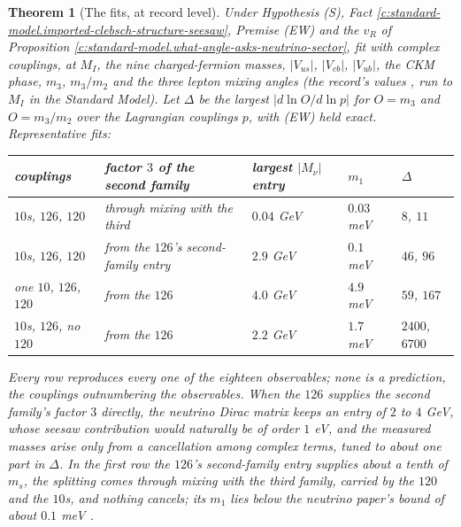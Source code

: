 \documentclass[11pt]{article}
\newtheorem{theorem}{Theorem}[section]
\theoremstyle{definition}
\theoremstyle{plain}
\newcommand{\changedmark}[2]{\marginpar{\raggedright\scriptsize\color{#1}#2}}
\begin{document}
\begin{theorem}[The fits, at record level]\label{c:standard-model.fits-record-level}
\changedmark{gray}{reworded}
Under Hypothesis (S), Fact \ref{c:standard-model.imported-clebsch-structure-seesaw}, Premise (EW) and the $v_{R}$ of Proposition \ref{c:standard-model.what-angle-asks-neutrino-sector}, fit with complex couplings, at $M_{I}$, the nine charged-fermion masses, $|V_{us}|$, $|V_{cb}|$, $|V_{ub}|$, the CKM phase, $m_{3}$, $m_{3}/m_{2}$ and the three lepton mixing angles (the record's values \cite{PDG2024}, run to $M_{I}$ in the Standard Model). Let $\Delta$ be the largest $|d\ln O/d\ln p|$ for $O = m_{3}$ and $O = m_{3}/m_{2}$ over the Lagrangian couplings $p$, with (EW) held exact. Representative fits:
\begin{center}\small
\begin{tabular}{@{}lllll@{}}
\toprule
couplings & factor $3$ of the second family & largest $|M_{\nu}|$ entry & $m_{1}$ & $\Delta$ \\
\midrule
$10$s, $126$, $120$ & through mixing with the third & $0.04$ GeV & $0.03$ meV & $8$, $11$ \\
$10$s, $126$, $120$ & from the $126$'s second-family entry & $2.9$ GeV & $0.1$ meV & $46$, $96$ \\
one $10$, $126$, $120$ & from the $126$ & $4.0$ GeV & $4.9$ meV & $59$, $167$ \\
$10$s, $126$, no $120$ & from the $126$ & $2.2$ GeV & $1.7$ meV & $2400$, $6700$ \\
\bottomrule
\end{tabular}
\end{center}
Every row reproduces every one of the eighteen observables; none is a prediction, the couplings outnumbering the observables. When the $126$ supplies the second family's factor $3$ directly, the neutrino Dirac matrix keeps an entry of $2$ to $4$ GeV, whose seesaw contribution would naturally be of order $1$ eV, and the measured masses arise only from a cancellation among complex terms, tuned to about one part in $\Delta$. In the first row the $126$'s second-family entry supplies about a tenth of $m_{s}$, the splitting comes through mixing with the third family, carried by the $120$ and the $10$s, and nothing cancels; its $m_{1}$ lies below the neutrino paper's bound of about $0.1$ meV \cite{ButlerT15}.
\end{theorem}
\end{document}
